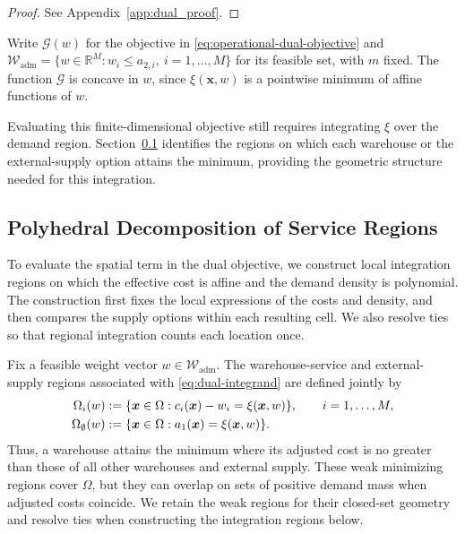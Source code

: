 \documentclass[a4paper,fleqn]{cas-sc}
\theoremstyle{remark}
\theoremstyle{plain}
\begin{document}
\begin{proof}
See Appendix~\ref{app:dual_proof}.
\end{proof}

Write $\mathcal G(w)$ for the objective in \eqref{eq:operational-dual-objective} and $\mathcal W_{\mathrm{adm}}=\{w\in\mathbb R^M:w_i\le a_{2,i},\ i=1,\ldots,M\}$ for its feasible set, with $m$ fixed. The function $\mathcal G$ is concave in $w$, since $\xi(\bm x,w)$ is a pointwise minimum of affine functions of $w$.

Evaluating this finite-dimensional objective still requires integrating $\xi$ over the demand region. Section~\ref{subsec:service-region-structure} identifies the regions on which each warehouse or the external-supply option attains the minimum, providing the geometric structure needed for this integration.

\subsection{Polyhedral Decomposition of Service Regions}\label{subsec:service-region-structure}

To evaluate the spatial term in the dual objective, we construct local integration regions on which the effective cost is affine and the demand density is polynomial. The construction first fixes the local expressions of the costs and density, and then compares the supply options within each resulting cell. We also resolve ties so that regional integration counts each location once.

Fix a feasible weight vector $w\in\mathcal W_{\mathrm{adm}}$. The warehouse-service and external-supply regions associated with \eqref{eq:dual-integrand} are defined jointly by
\begin{subequations}\label{eq:region-definitions}
\allowdisplaybreaks[0]
\begin{align}
    \Omega_i(w)&:=\{\bm x\in\Omega:c_i(\bm x)-w_i=\xi(\bm x,w)\},\qquad i=1,\ldots,M,\label{eq:warehouse-region}\\
    \Omega_\emptyset(w)&:=\{\bm x\in\Omega:a_1(\bm x)=\xi(\bm x,w)\}.\label{eq:external-region}
\end{align}
\end{subequations}
Thus, a warehouse attains the minimum where its adjusted cost is no greater than those of all other warehouses and external supply. These weak minimizing regions cover $\Omega$, but they can overlap on sets of positive demand mass when adjusted costs coincide. We retain the weak regions for their closed-set geometry and resolve ties when constructing the integration regions below.
\end{document}
